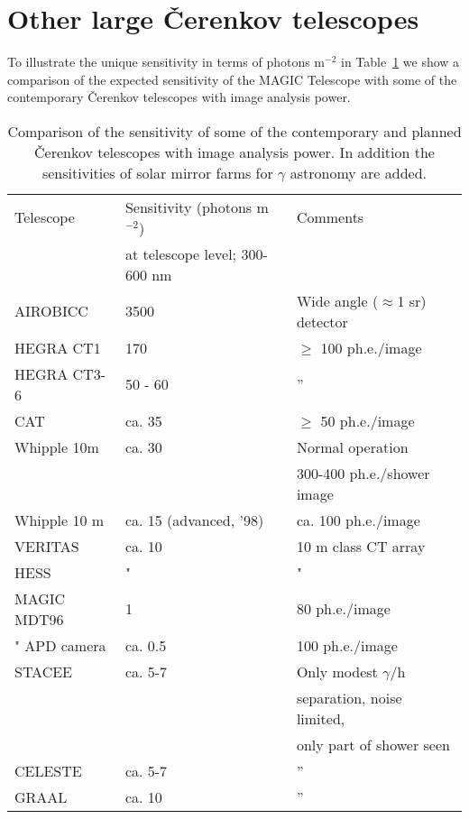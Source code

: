 \section{Other large \v{C}erenkov telescopes}

\par\medskip
To illustrate the unique sensitivity in terms of photons m$^{-2}$
in Table~\ref{tab-sensi} we show a comparison of the expected
sensitivity of the MAGIC Telescope with some of the contemporary
\v{C}erenkov telescopes with image analysis power.

\begin{table}

\begin{tabular}{|l|l|l|}
\hline
Telescope & Sensitivity (photons m$^{-2}$) & Comments \\ 
& at telescope level; 300-600 nm &  \\ \hline\hline
AIROBICC & 3500 & Wide angle ($\approx $1 sr) detector \\ 
HEGRA CT1 & 170 & $\geq $ 100 ph.e./image \\ 
HEGRA CT3-6 & 50 - 60 & '' \\ 
CAT & ca. 35 & $\geq $ 50 ph.e./image \\ 
Whipple 10m & ca. 30 & Normal operation \\[-0.5ex] 
&  & 300-400 ph.e./shower image \\ \hline
Whipple 10 m & ca. 15 (advanced, '98) & ca. 100 ph.e./image \\ 
VERITAS & ca. 10 & 10 m class CT array \\ 
HESS & " & " \\ 
MAGIC MDT96 & 1 & 80 ph.e./image \\ 
" APD camera & ca. 0.5 & 100 ph.e./image \\ \hline
STACEE & ca. 5-7  & Only modest $\gamma $/h \\%
[-0.5ex] 
&  & separation, noise limited, \\[-0.5ex] 
&  & only part of shower seen \\ 
CELESTE & ca. 5-7 & '' \\ 
GRAAL & ca. 10 & '' \\ \hline
\end{tabular}
\caption{\label{tab-sensi} Comparison of the sensitivity of some of the contemporary
and planned \v{C}erenkov
telescopes with image analysis power. In addition the sensitivities of solar mirror
farms for $\gamma$ astronomy are added.}
\end{table}

